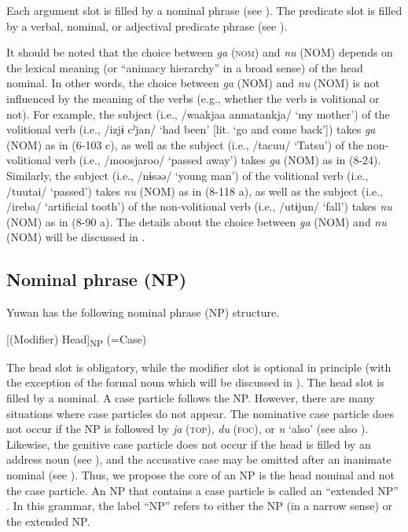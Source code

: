 Each argument slot is filled by a nominal phrase (see ). The predicate slot is filled by a verbal, nominal, or adjectival predicate phrase (see ).

It should be noted that the choice between \textit{ga} (\textsc{nom}) and \textit{nu} (NOM) depends on the lexical meaning (or “animacy hierarchy” in a broad sense) of the head nominal. In other words, the choice between \textit{ga} (NOM) and \textit{nu} (NOM) is not influenced by the meaning of the verbs (e.g., whether the verb is volitional or not). For example, the subject (i.e., /waakjaa anmatankja/ ‘my mother’) of the volitional verb (i.e., /izjɨ cˀjan/ ‘had been’ [lit. ‘go and come back’]) takes \textit{ga} (NOM) as in (6-103 c), as well as the subject (i.e., /tacuu/ ‘Tatsu’) of the non-volitional verb (i.e., /moosjaroo/ ‘passed away’) takes \textit{ga} (NOM) as in (8-24). Similarly, the subject (i.e., /nɨsəə/ ‘young man’) of the volitional verb (i.e., /tuutai/ ‘passed’) takes \textit{nu} (NOM) as in (8-118 a), as well as the subject (i.e., /ireba/ ‘artificial tooth’) of the non-volitional verb (i.e., /utɨjun/ ‘fall’) takes \textit{nu} (NOM) as in (8-90 a). The details about the choice between \textit{ga} (NOM) and \textit{nu} (NOM) will be discussed in .

\subsection{Nominal phrase (NP)}\label{sec:4.1.2}

Yuwan has the following nominal phrase (NP) structure.

[(Modifier) Head]\textsubscript{NP}\textit{\textsubscript{} }(=Case)

The head slot is obligatory, while the modifier slot is optional in principle (with the exception of the formal noun which will be discussed in ). The head slot is filled by a nominal. A case particle follows the NP. However, there are many situations where case particles do not appear. The nominative case particle does not occur if the NP is followed by \textit{ja} (\textsc{top}), \textit{du} (\textsc{foc}), or \textit{n} ‘also’ (see also ). Likewise, the genitive case particle does not occur if the head is filled by an address noun (see ), and the accusative case may be omitted after an inanimate nominal (see ). Thus, we propose the core of an NP is the head nominal and not the case particle. An NP that contains a case particle is called an “extended NP” \citep[167]{Shimoji2008}. In this grammar, the label “NP” refers to either the NP (in a narrow sense) or the extended NP.

